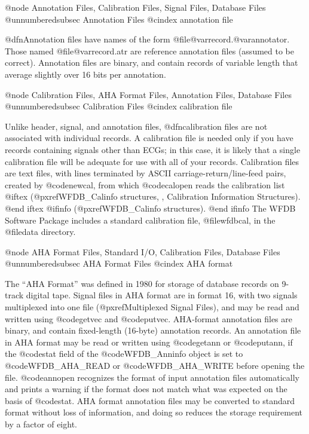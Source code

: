 {{{{{{{{{{@node     Annotation Files, Calibration Files, Signal Files, Database Files
@unnumberedsubsec Annotation Files
@cindex annotation file

@dfn{Annotation files} have names of the form
@file{@var{record}.@var{annotator}}.  Those named
@file{@var{record}.atr} are reference annotation files (assumed to be
correct).  Annotation files are binary, and contain records of variable
length that average slightly over 16 bits per annotation.

@node     Calibration Files, AHA Format Files, Annotation Files, Database Files
@unnumberedsubsec Calibration Files
@cindex calibration file

Unlike header, signal, and annotation files, @dfn{calibration files} are
not associated with individual records.  A calibration file is needed
only if you have records containing signals other than ECGs;  in this
case, it is likely that a single calibration file will be adequate for use
with all of your records.  Calibration files are text files, with lines
terminated by ASCII carriage-return/line-feed pairs, created by
@code{newcal}, from which @code{calopen} reads the calibration list
@iftex
(@pxref{WFDB_Calinfo structures, , Calibration Information Structures}).
@end iftex
@ifinfo
(@pxref{WFDB_Calinfo structures}).
@end ifinfo
The WFDB Software Package includes a standard calibration file,
@file{wfdbcal}, in the @file{data} directory.

@node     AHA Format Files, Standard I/O, Calibration Files, Database Files
@unnumberedsubsec AHA Format Files
@cindex AHA format

The ``AHA Format'' was defined in 1980 for storage of database records
on 9-track digital tape.  Signal files in AHA format are in format 16,
with two signals multiplexed into one file (@pxref{Multiplexed Signal Files}),
and may be read and written using @code{getvec} and @code{putvec}.
AHA-format annotation files are binary, and contain fixed-length
(16-byte) annotation records.  An annotation file in AHA format may be
read or written using @code{getann} or @code{putann}, if the @code{stat}
field of the @code{WFDB_Anninfo} object is set to @code{WFDB_AHA_READ} or
@code{WFDB_AHA_WRITE} before opening the file.  @code{annopen} recognizes the
format of input annotation files automatically and prints a warning if
the format does not match what was expected on the basis of @code{stat}.
AHA format annotation files may be converted to standard format without
loss of information, and doing so reduces the storage requirement by a
factor of eight.

}}}}}}}}}}
